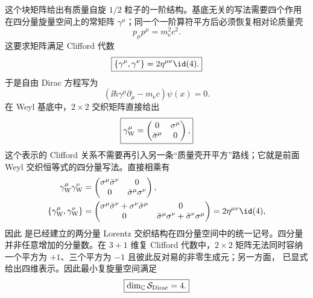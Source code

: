 这个块矩阵给出有质量自旋 $1/2$ 粒子的一阶结构。基底无关的写法需要四个作用在四分量旋量空间上的常矩阵 $\gamma^\mu$；同一个一阶算符平方后必须恢复相对论质量壳
\begin{equation}
 p_\mu p^\mu=m_{\mathrm e}^2c^2.
 \label{eq:mass-shell}
\end{equation}
这要求矩阵满足 Clifford 代数
\begin{equation}
 \boxed{\{\gamma^\mu,\gamma^\nu\}=2\eta^{\mu\nu}\id(4).}
 \label{eq:clifford-general}\end{equation}
于是自由 Dirac 方程写为
\begin{equation}
 \boxed{
 \left(\ii\hbar\gamma^\mu\partial_\mu-m_{\mathrm e} c\right)\psi(x)=0.}
 \label{eq:general-first-order}
\end{equation}
在 Weyl 基底中，$2\times2$ 交织矩阵直接给出
\begin{equation}
 \boxed{
 \gamma^\mu_{\rm W}=
 \begin{pmatrix}
 0&\sigma^\mu\\
 \bar\sigma^\mu&0
 \end{pmatrix},}
 \label{eq:weyl-gamma}
\end{equation}
这个表示的 Clifford 关系不需要再引入另一条“质量壳开平方”路线；它就是前面 Weyl 交织恒等式的四分量写法。直接相乘有
\begin{align*}
 \gamma^\mu_{\rm W}\gamma^\nu_{\rm W}
 &=\begin{pmatrix}
 \sigma^\mu\bar\sigma^\nu&0\\
 0&\bar\sigma^\mu\sigma^\nu
 \end{pmatrix},\\
 \{\gamma^\mu_{\rm W},\gamma^\nu_{\rm W}\}
 &=\begin{pmatrix}
 \sigma^\mu\bar\sigma^\nu+\sigma^\nu\bar\sigma^\mu&0\\
 0&\bar\sigma^\mu\sigma^\nu+\bar\sigma^\nu\sigma^\mu
 \end{pmatrix}
 =2\eta^{\mu\nu}\id(4),
\end{align*}
因此 是已经建立的两分量 Lorentz 交织结构在四分量空间中的统一记号。四分量并非任意增加的分量数。在 $3+1$ 维复 Clifford 代数中，$2\times2$ 矩阵无法同时容纳一个平方为 $+1$、三个平方为 $-1$ 且彼此反对易的非零生成元；另一方面， 已显式给出四维表示。因此最小复旋量空间满足
\begin{equation}
 \boxed{\dim_{\mathbb C}\mathcal S_{\rm Dirac}=4.}
 \label{eq:dirac-minimal-spinor-dimension-dp68}
\end{equation}

